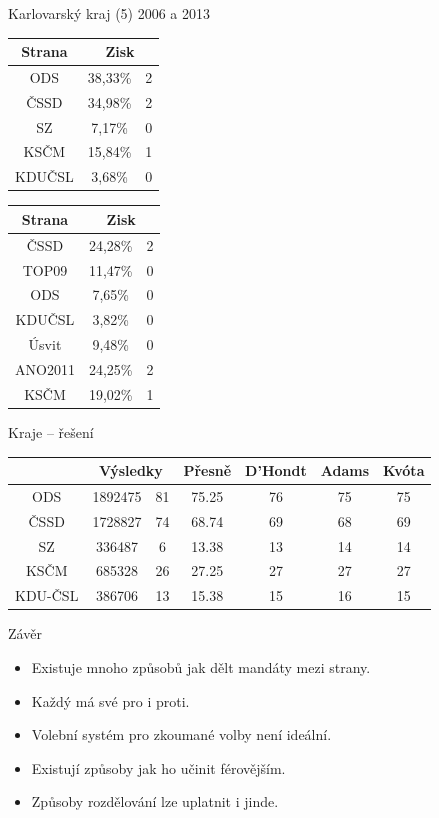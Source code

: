 \documentclass[17pt]{beamer}
\begin{document}
\begin{frame}{Karlovarský kraj (5) 2006 a 2013}
\begin{center}
\begin{tabular}{|c|c|c|}
\hline
Strana  & \multicolumn{2}{c|}{Zisk}   \\ \hline
ODS     & 38,33\% & 2 \\ \hline
ČSSD    & 34,98\% & 2 \\ \hline
SZ      & 7,17\% & 0 \\ \hline
KSČM    & 15,84\% & 1 \\ \hline
KDUČSL & 3,68\% & 0  \\ \hline
\end{tabular}
\begin{tabular}{|c|c|c|}
\hline
Strana  & \multicolumn{2}{c|}{Zisk}     \\ \hline
ČSSD    & 24,28\% & 2 \\ \hline
TOP09   & 11,47\% & 0 \\ \hline
ODS     & 7,65\% & 0  \\ \hline
KDUČSL & 3,82\% & 0 \\ \hline
Úsvit   & 9,48\% & 0 \\ \hline
ANO2011 & 24,25\% & 2 \\ \hline
KSČM    & 19,02\% & 1 \\ \hline
\end{tabular}
\end{center}
\end{frame}

\begin{frame}{Kraje -- řešení}
\footnotesize
\begin{tabular}{|c|c|c|c|c|c|c|} \hline
 & \multicolumn{2}{c|}{Výsledky} & Přesně & D'Hondt & Adams & Kvóta\\
\hline ODS & 1892475 & 81 & 75.25 & 76 & 75 & 75\\
\hline ČSSD & 1728827 & 74 & 68.74 & 69 & 68 & 69\\
\hline SZ & 336487 & 6 & 13.38 & 13 & 14 & 14 \\
\hline KSČM & 685328 & 26 & 27.25 & 27 & 27 & 27 \\
\hline KDU-ČSL & 386706 & 13 & 15.38 & 15 & 16 & 15 \\
\hline
\end{tabular}
\end{frame}

\begin{frame}{Závěr}
\begin{itemize}
\item Existuje mnoho způsobů jak dělt mandáty mezi strany.
\item Každý má své pro i proti.
\item Volební systém pro zkoumané volby není ideální.
\item Existují způsoby jak ho učinit férovějším.
\item Způsoby rozdělování lze uplatnit i jinde.
\end{itemize}
\end{frame}
\end{document}
